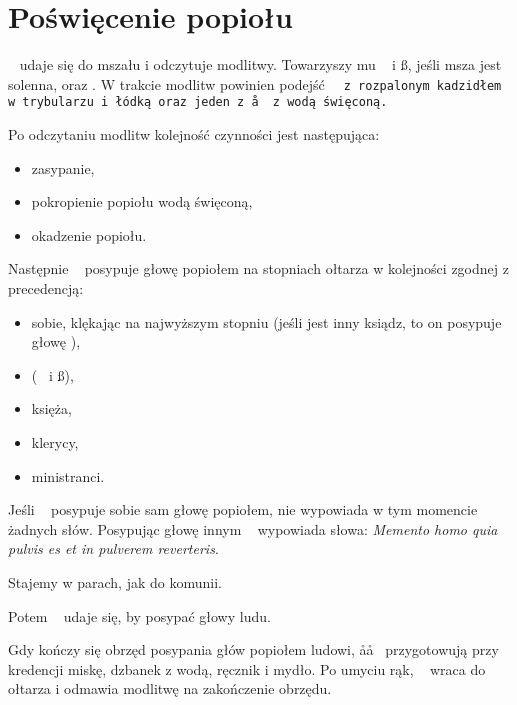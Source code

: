 \section{Poświęcenie popiołu}
\begin{itemize*}
	\item \ii~ udaje się do mszału i odczytuje modlitwy. Towarzyszy mu \dd~ i
	      \ss, jeśli msza jest solenna, oraz . W trakcie modlitw powinien
	      podejść \tt~ z rozpalonym kadzidłem w trybularzu i łódką oraz jeden
	      z \aa~ z wodą święconą.
	\item Po odczytaniu modlitw kolejność czynności jest następująca:
	      \begin{itemize}
		      \item zasypanie,
		      \item pokropienie popiołu wodą święconą,
		      \item okadzenie popiołu.
	      \end{itemize}
	\item Następnie \ii~ posypuje głowę popiołem na stopniach ołtarza w
	      kolejności zgodnej z precedencją:
	      \begin{itemize}
		      \item sobie, klękając na najwyższym stopniu (jeśli jest inny ksiądz,
		            to on posypuje głowę \ii),
		      \item (\dd~ i \ss),
		      \item księża,
		      \item klerycy,
		      \item ministranci.
	      \end{itemize}
	\item Jeśli \ii~ posypuje sobie sam głowę popiołem, nie wypowiada w tym
	      momencie żadnych słów. Posypując głowę innym \ii~ wypowiada słowa:
	      \textit{Memento homo quia pulvis es et in pulverem reverteris}.
	\item Stajemy w parach, jak do komunii.
	\item Potem \ii~ udaje się, by posypać głowy ludu.
	\item Gdy kończy się obrzęd posypania głów popiołem ludowi, \aa\aa~
	      przygotowują przy kredencji miskę, dzbanek z wodą, ręcznik i mydło. Po
	      umyciu rąk, \ii~ wraca do ołtarza i odmawia modlitwę na zakończenie
	      obrzędu.
\end{itemize*}